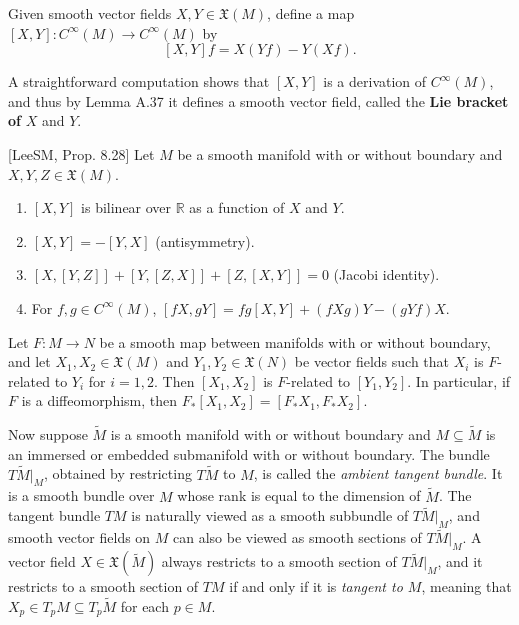 Given smooth vector fields $X, Y \in \mathfrak{X}(M)$, define a map $[X, Y] : C^\infty(M) \to C^\infty(M)$ by
\[
[X, Y]f = X(Yf) - Y(Xf).
\]

A straightforward computation shows that $[X, Y]$ is a derivation of $C^\infty(M)$, and thus by Lemma A.37 it defines a smooth vector field, called the \textbf{Lie bracket of } $X$ and $Y$.

\begin{proposition}
\label{prop:lie-bracket-properties}
[LeeSM, Prop. 8.28] Let $M$ be a smooth manifold with or without boundary and $X, Y, Z \in \mathfrak{X}(M)$.
\begin{enumerate}[label=(\alph*)]
\item $[X, Y]$ is bilinear over $\mathbb{R}$ as a function of $X$ and $Y$.
\item $[X, Y] = -[Y, X]$ (antisymmetry).
\item $[X, [Y, Z]] + [Y, [Z, X]] + [Z, [X, Y]] = 0$ (Jacobi identity).
\item For $f, g \in C^\infty(M)$, $[fX, gY] = fg[X, Y] + (fXg)Y - (gYf)X$.
\end{enumerate}
\end{proposition}

\begin{proposition}
\label{prop:naturality-of-lie-brackets}
Let $F : M \to N$ be a smooth map between manifolds with or without boundary, and let $X_1, X_2 \in \mathfrak{X}(M)$ and $Y_1, Y_2 \in \mathfrak{X}(N)$ be vector fields such that $X_i$ is $F$-related to $Y_i$ for $i = 1, 2$. Then $[X_1, X_2]$ is $F$-related to $[Y_1, Y_2]$. In particular, if $F$ is a diffeomorphism, then $F_*[X_1, X_2] = [F_* X_1, F_* X_2]$.
\end{proposition}

Now suppose $\tilde{M}$ is a smooth manifold with or without boundary and $M \subseteq \tilde{M}$ is an immersed or embedded submanifold with or without boundary. The bundle $T\tilde{M}|_M$, obtained by restricting $T\tilde{M}$ to $M$, is called the \emph{ambient tangent bundle}. It is a smooth bundle over $M$ whose rank is equal to the dimension of $\tilde{M}$. The tangent bundle $TM$ is naturally viewed as a smooth subbundle of $T\tilde{M}|_M$, and smooth vector fields on $M$ can also be viewed as smooth sections of $T\tilde{M}|_M$. A vector field $X \in \mathfrak{X}(\tilde{M})$ always restricts to a smooth section of $T\tilde{M}|_M$, and it restricts to a smooth section of $TM$ if and only if it is \emph{tangent to $M$}, meaning that $X_p \in T_p M \subseteq T_p \tilde{M}$ for each $p \in M$.

